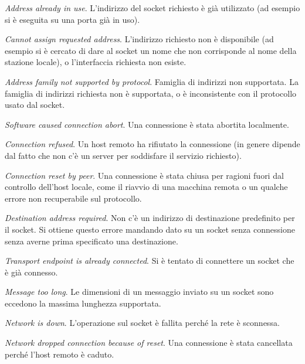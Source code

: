 \begin{basedescript}{\desclabelwidth{1.5cm}\desclabelstyle{\nextlinelabel}}
\item[\errcode{EADDRINUSE} \textit{Address already in use}.] L'indirizzo del
  socket richiesto è già utilizzato (ad esempio si è eseguita 
  su una porta già in uso).
\item[\errcode{EADDRNOTAVAIL} \textit{Cannot assign requested
    address}.]  L'indirizzo richiesto non è disponibile (ad esempio si
  è cercato di dare al socket un nome che non corrisponde al nome
  della stazione locale), o l'interfaccia richiesta non esiste.
\item[\errcode{EAFNOSUPPORT} \textit{Address family not supported by
    protocol}.]  Famiglia di indirizzi non supportata. La famiglia di
  indirizzi richiesta non è supportata, o è inconsistente con il protocollo
  usato dal socket.
\item[\errcode{ECONNABORTED} \textit{Software caused connection abort}.] Una
  connessione è stata abortita localmente. 
\item[\errcode{ECONNREFUSED} \textit{Connection refused}.] Un host remoto ha
  rifiutato la connessione (in genere dipende dal fatto che non c'è un server
  per soddisfare il servizio richiesto).  
\item[\errcode{ECONNRESET} \textit{Connection reset by peer}.] Una connessione
  è stata chiusa per ragioni fuori dal controllo dell'host locale, come il
  riavvio di una macchina remota o un qualche errore non recuperabile sul
  protocollo.
\item[\errcode{EDESTADDRREQ} \textit{Destination address required}.] Non c'è
  un indirizzo di destinazione predefinito per il socket. Si ottiene questo
  errore mandando dato su un socket senza connessione senza averne prima
  specificato una destinazione.
\item[\errcode{EISCONN} \textit{Transport endpoint is already connected}.] Si
  è tentato di connettere un socket che è già connesso.
\item[\errcode{EMSGSIZE} \textit{Message too long}.] Le dimensioni di un
  messaggio inviato su un socket sono eccedono la massima lunghezza supportata.
\item[\errcode{ENETDOWN} \textit{Network is down}.] L'operazione sul socket è
  fallita perché la rete è sconnessa.
\item[\errcode{ENETRESET} \textit{Network dropped connection because of
    reset}.]  Una connessione è stata cancellata perché l'host remoto è
  caduto.

\end{basedescript}
